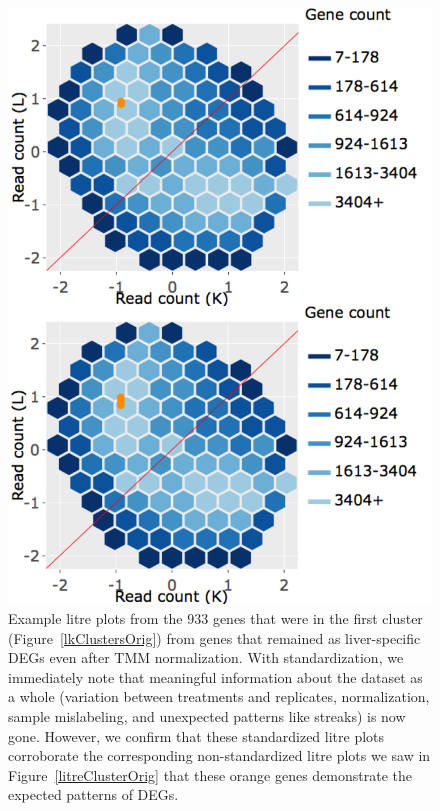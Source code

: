 \documentclass{article}
\begin{document}
  \null
  \begin{figure}[t!]
  \centerline{\includegraphics[width=0.7\columnwidth]{../MakeFigures/Dashboards/litreClusterOrig-St/litreClusterOrig-St.jpg}}
  \caption{Example litre plots from the 933 genes that were in the first cluster (Figure~\ref{lkClustersOrig}) from genes that remained as liver-specific DEGs even after TMM normalization. With standardization, we immediately note that meaningful information about the dataset as a whole (variation between treatments and replicates, normalization, sample mislabeling, and unexpected patterns like streaks) is now gone. However, we confirm that these standardized litre plots corroborate the corresponding non-standardized litre plots we saw in Figure~\ref{litreClusterOrig} that these orange genes demonstrate the expected patterns of DEGs.
  \label{litreClusterOrig-St}}
  \end{figure}
  
\end{document}
